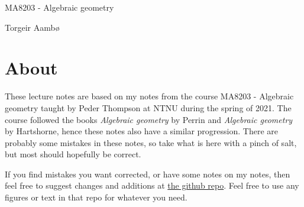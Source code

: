 \begin{titlepage}

    \vspace*{\fill}
    
    \begin{center}
    \Large MA8203 - Algebraic geometry
    \end{center}
    
    
    
    \begin{center}
    Torgeir Aambø
    \end{center}
    
    \vspace{\fill}
    


\section*{About}
These lecture notes are based on my notes from the course MA8203 - Algebraic geometry taught by Peder Thompson at NTNU during the spring of 2021. The course followed the books \textit{Algebraic geometry} by Perrin and \textit{Algebraic geometry} by Hartshorne, hence these notes also have a similar progression. There are probably some mistakes in these notes, so take what is here with a pinch of salt, but most should hopefully be correct. 

If you find mistakes you want corrected, or have some notes on my notes, then feel free to suggest changes and additions at \href{https://github.com/torgeiraamboe/MA8203-lecture_notes}{the github repo}. Feel free to use any figures or text in that repo for whatever you need. 

\listoftodos
    
\vspace{\fill}
    
    

\end{titlepage}